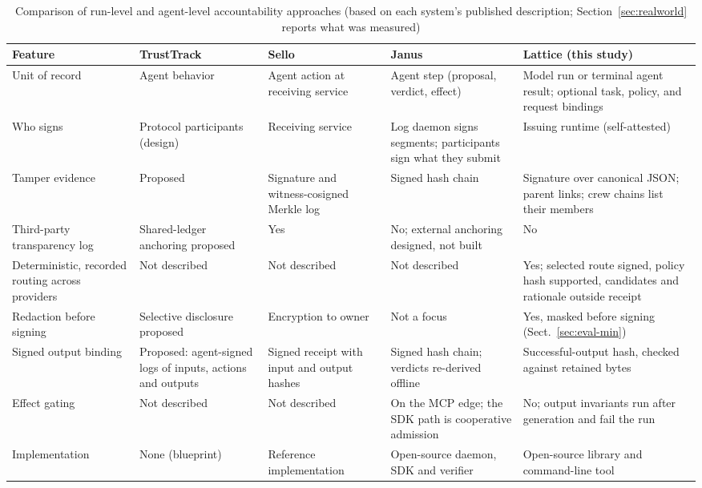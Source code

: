 \begin{table}[!htbp]
\centering
\caption{Comparison of run-level and agent-level accountability approaches (based on each system's published description; Section~\ref{sec:realworld} reports what was measured)}
\label{tab:compare}
\begingroup\footnotesize{}\setlength{\tabcolsep}{4pt}
\begin{tabularx}{\textwidth}{@{}>{\raggedright\arraybackslash}p{29mm}>{\raggedright\arraybackslash}X>{\raggedright\arraybackslash}X>{\raggedright\arraybackslash}X>{\raggedright\arraybackslash}X@{}}
\toprule
Feature & TrustTrack & Sello & Janus & Lattice (this study) \\
\midrule
Unit of record & Agent behavior & Agent action at receiving service & Agent step (proposal, verdict, effect) & Model run or terminal agent result; optional task, policy, and request bindings \\
Who signs & Protocol participants (design) & Receiving service & Log daemon signs segments; participants sign what they submit & Issuing runtime (self-attested) \\
Tamper evidence & Proposed & Signature and witness-cosigned Merkle log & Signed hash chain & Signature over canonical JSON; parent links; crew chains list their members \\
Third-party transparency log & Shared-ledger anchoring proposed & Yes & No; external anchoring designed, not built & No \\
Deterministic, recorded routing across providers & Not described & Not described & Not described & Yes; selected route signed, policy hash supported, candidates and rationale outside receipt \\
Redaction before signing & Selective disclosure proposed & Encryption to owner & Not a focus & Yes, masked before signing (Sect.~\ref{sec:eval-min}) \\
Signed output binding & Proposed: agent-signed logs of inputs, actions and outputs & Signed receipt with input and output hashes & Signed hash chain; verdicts re-derived offline & Successful-output hash, checked against retained bytes \\
Effect gating & Not described & Not described & On the MCP edge; the SDK path is cooperative admission & No; output invariants run after generation and fail the run \\
Implementation & None (blueprint) & Reference implementation & Open-source daemon, SDK and verifier & Open-source library and command-line tool \\

\end{tabularx}
\end{table}
